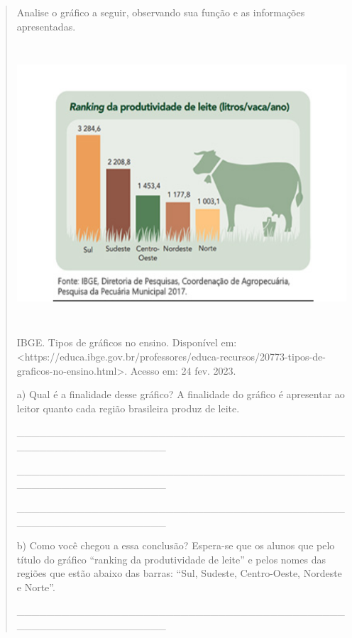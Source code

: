 \begin{quote}
Analise o gráfico a seguir, observando sua função e as informações
apresentadas.

\includegraphics[width=5.68530in,height=4.10069in]{media/image29.png}

IBGE. Tipos de gráficos no ensino. Disponível em:
\textless{}https://educa.ibge.gov.br/professores/educa-recursos/20773-tipos-de-graficos-no-ensino.html\textgreater{}.
Acesso em: 24 fev. 2023.

a) Qual é a finalidade desse gráfico? A finalidade do gráfico é
apresentar ao leitor quanto cada região brasileira produz de leite.

\_\_\_\_\_\_\_\_\_\_\_\_\_\_\_\_\_\_\_\_\_\_\_\_\_\_\_\_\_\_\_\_\_\_\_\_\_\_\_\_\_\_\_\_\_\_\_\_\_\_\_\_\_\_\_\_\_\_\_\_\_\_\_\_

\_\_\_\_\_\_\_\_\_\_\_\_\_\_\_\_\_\_\_\_\_\_\_\_\_\_\_\_\_\_\_\_\_\_\_\_\_\_\_\_\_\_\_\_\_\_\_\_\_\_\_\_\_\_\_\_\_\_\_\_\_\_\_\_

\_\_\_\_\_\_\_\_\_\_\_\_\_\_\_\_\_\_\_\_\_\_\_\_\_\_\_\_\_\_\_\_\_\_\_\_\_\_\_\_\_\_\_\_\_\_\_\_\_\_\_\_\_\_\_\_\_\_\_\_\_\_\_\_

b) Como você chegou a essa conclusão? Espera-se que os alunos que pelo
título do gráfico ``ranking da produtividade de leite'' e pelos nomes
das regiões que estão abaixo das barras: ``Sul, Sudeste, Centro-Oeste,
Nordeste e Norte''.

\_\_\_\_\_\_\_\_\_\_\_\_\_\_\_\_\_\_\_\_\_\_\_\_\_\_\_\_\_\_\_\_\_\_\_\_\_\_\_\_\_\_\_\_\_\_\_\_\_\_\_\_\_\_\_\_\_\_\_\_\_\_\_\_


\end{quote}
